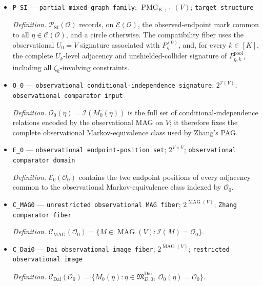 \documentclass{article}
\begin{document}
\begin{itemize}
  \par\smallskip\noindent\emph{Definition.} \(\mu_\eta(e)\) is the endpoint mark at the observed endpoint position \(e\) in the corresponding induced graph \(M_k(\eta)[V]\).
  \item \texttt{P\_\allowbreak{}SI} --- \texttt{partial mixed-\allowbreak{}graph family}; \(\operatorname{PMG}_{K+1}(V)\); \texttt{target structure}
  \par\smallskip\noindent\emph{Definition.} \(\mathcal P_{\mathrm{SI}}(\mathcal O)\) records, on \(\mathcal E(\mathcal O)\), the observed-endpoint mark common to all \(\eta\in\mathcal C(\mathcal O)\), and a circle otherwise. The compatibility fiber uses the observational \(U_0=V\) signature associated with \(P_{\eta}^{(0)}\), and, for every \(k\in[K]\), the complete \(U_k\)-level adjacency and unshielded-collider signature of \(P_{\eta,k}^{\mathrm{pool}}\), including all \(\zeta_k\)-involving constraints.
  \item \texttt{O\_\allowbreak{}0} --- \texttt{observational conditional-\allowbreak{}independence signature}; \(2^{\mathcal I(V)}\); \texttt{observational comparator input}
  \par\smallskip\noindent\emph{Definition.} \(\mathcal O_0(\eta)=\mathcal I(M_0(\eta))\) is the full set of conditional-independence relations encoded by the observational MAG on \(V\); it therefore fixes the complete observational Markov-equivalence class used by Zhang's PAG.
  \item \texttt{E\_\allowbreak{}0} --- \texttt{observational endpoint-\allowbreak{}position set}; \(2^{V\times V}\); \texttt{observational comparator domain}
  \par\smallskip\noindent\emph{Definition.} \(\mathcal E_0(\mathcal O_0)\) contains the two endpoint positions of every adjacency common to the observational Markov-equivalence class indexed by \(\mathcal O_0\).
  \item \texttt{C\_\allowbreak{}MAG0} --- \texttt{unrestricted observational MAG fiber}; \(2^{\operatorname{MAG}(V)}\); \texttt{Zhang comparator fiber}
  \par\smallskip\noindent\emph{Definition.} \(\mathcal C_{\mathrm{MAG}}(\mathcal O_0)=\{M\in\operatorname{MAG}(V):\mathcal I(M)=\mathcal O_0\}\).
  \item \texttt{C\_\allowbreak{}Dai0} --- \texttt{Dai observational image fiber}; \(2^{\operatorname{MAG}(V)}\); \texttt{restricted observational image}
  \par\smallskip\noindent\emph{Definition.} \(\mathcal C_{\mathrm{Dai}}(\mathcal O_0)=\{M_0(\eta):\eta\in\mathfrak M_{D,0}^{\mathrm{Dai}},\ \mathcal O_0(\eta)=\mathcal O_0\}\).

\end{itemize}
\end{document}
